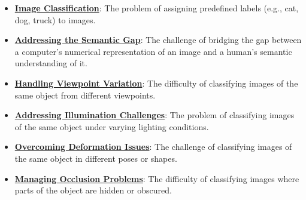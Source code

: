 \documentclass{article}%
\begin{document}
\begin{itemize}[leftmargin=*]%
\item \href{https://purdue.brightspace.com/d2l/common/assets/pdfjs-d2l-dist/1.0.14-legacy/web/viewer.html?file=%2Fcontent%2Fenforced%2F1095467-wl.202510.CS.24300.001%2F07L2-Vision.pdf%3Fou%3D1095467&lang=en-us&container=d2l-fileviewer-rendered-pdf&fullscreen=d2l-fileviewer-rendered-pdf-dialog&height=667#page=3}{\textbf{Image Classification}}: The problem of assigning predefined labels (e.g., cat, dog, truck) to images.%
\item \href{https://purdue.brightspace.com/d2l/common/assets/pdfjs-d2l-dist/1.0.14-legacy/web/viewer.html?file=%2Fcontent%2Fenforced%2F1095467-wl.202510.CS.24300.001%2F07L2-Vision.pdf%3Fou%3D1095467&lang=en-us&container=d2l-fileviewer-rendered-pdf&fullscreen=d2l-fileviewer-rendered-pdf-dialog&height=667#page=4}{\textbf{Addressing the Semantic Gap}}: The challenge of bridging the gap between a computer's numerical representation of an image and a human's semantic understanding of it.%
\item \href{https://purdue.brightspace.com/d2l/common/assets/pdfjs-d2l-dist/1.0.14-legacy/web/viewer.html?file=%2Fcontent%2Fenforced%2F1095467-wl.202510.CS.24300.001%2F07L2-Vision.pdf%3Fou%3D1095467&lang=en-us&container=d2l-fileviewer-rendered-pdf&fullscreen=d2l-fileviewer-rendered-pdf-dialog&height=667#page=6}{\textbf{Handling Viewpoint Variation}}: The difficulty of classifying images of the same object from different viewpoints.%
\item \href{https://purdue.brightspace.com/d2l/common/assets/pdfjs-d2l-dist/1.0.14-legacy/web/viewer.html?file=%2Fcontent%2Fenforced%2F1095467-wl.202510.CS.24300.001%2F07L2-Vision.pdf%3Fou%3D1095467&lang=en-us&container=d2l-fileviewer-rendered-pdf&fullscreen=d2l-fileviewer-rendered-pdf-dialog&height=667#page=7}{\textbf{Addressing Illumination Challenges}}: The problem of classifying images of the same object under varying lighting conditions.%
\item \href{https://purdue.brightspace.com/d2l/common/assets/pdfjs-d2l-dist/1.0.14-legacy/web/viewer.html?file=%2Fcontent%2Fenforced%2F1095467-wl.202510.CS.24300.001%2F07L2-Vision.pdf%3Fou%3D1095467&lang=en-us&container=d2l-fileviewer-rendered-pdf&fullscreen=d2l-fileviewer-rendered-pdf-dialog&height=667#page=8}{\textbf{Overcoming Deformation Issues}}: The challenge of classifying images of the same object in different poses or shapes.%
\item \href{https://purdue.brightspace.com/d2l/common/assets/pdfjs-d2l-dist/1.0.14-legacy/web/viewer.html?file=%2Fcontent%2Fenforced%2F1095467-wl.202510.CS.24300.001%2F07L2-Vision.pdf%3Fou%3D1095467&lang=en-us&container=d2l-fileviewer-rendered-pdf&fullscreen=d2l-fileviewer-rendered-pdf-dialog&height=667#page=9}{\textbf{Managing Occlusion Problems}}: The difficulty of classifying images where parts of the object are hidden or obscured.%

\end{itemize}
\end{document}

